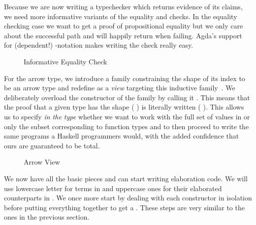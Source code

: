Because we are now writing a typechecker which returns evidence of its
claims, we need more informative variants of the equality and
 checks.
%
In the equality checking case we want to get a proof of propositional
equality but we only care about the successful path and will happily
return  when failing. Agda's support for (dependent!)
-notation makes writing the check really easy.

\begin{figure}[h]
\caption{Informative Equality Check\label{fig:informativeeqcheck}}
\end{figure}

For the arrow type, we introduce a family  constraining the
shape of its index to be an arrow type and redefine  as
a \emph{view} targeting this inductive
family~\cite{DBLP:conf/popl/Wadler87,DBLP:journals/jfp/McBrideM04}.
%
We deliberately overload the constructor of the  family by calling
it . This means that the proof that a given type has the shape
{(  )} is literally written {(  )}.
This allows us to specify \emph{in the type} whether we want to work with the
full set of values in  or only the subset corresponding to function
types and to then proceed to write the same programs a Haskell programmers would,
with the added confidence that ours are guaranteed to be total.

\begin{figure}[h]
\begin{minipage}[t]{0.45\textwidth}
\end{minipage}\hfill\begin{minipage}[t]{0.45\textwidth}
\end{minipage}
\caption{Arrow View\label{fig:informativecheck}}
\end{figure}

We now have all the basic pieces and can start writing elaboration code. We
will use lowercase letter for terms in  and uppercase ones for their
elaborated counterparts in . We once more start by dealing with each
constructor in isolation before putting everything together to get a
. These steps are very similar to the ones in the previous
section.

